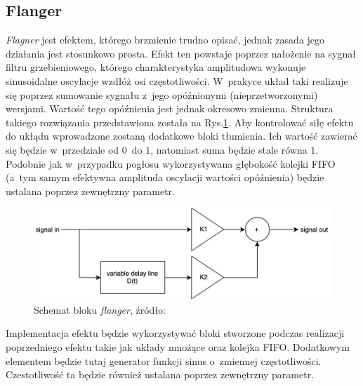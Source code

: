 
\subsection{Flanger}

\textit{Flagner} jest efektem, którego brzmienie trudno opisać, jednak zasada jego działania jest stosunkowo prosta. Efekt ten powstaje poprzez nałożenie na sygnał filtru grzebieniowego, którego charakterystyka amplitudowa wykonuje sinusoidalne oscylacje wzdłóż osi częstotliwości. W~prakyce układ taki realizuje się poprzez sumowanie sygnału z~jego opóźnionymi (nieprzetworzonymi) wersjami. Wartość tego opóźnienia jest jednak okresowo zmienna. Struktura takiego rozwiązania przedstawiona została na Rys.\ref{effects-flanger}. Aby kontrolować siłę efektu do ukłądu wprowadzone zostaną dodatkowe bloki tłumienia. Ich wartość zawierać się będzie w~przedziale od $0$~do $1$, natomiast suma będzie stale równa $1$. Podobnie jak w~przypadku pogłosu wykorzystywana głębokość kolejki FIFO (a~tym samym efektywna amplituda oscylacji wartości opóźnienia) będzie ustalana poprzez zewnętrzny parametr.

\vspace{0.5cm}
\begin{figure}[ht]
    \centering
    \includegraphics[scale=0.4]{img/theoretical-analysis/flanger.jpg}
    \captionsetup{format=plain,justification=centering}
    \caption{Schemat bloku \textit{flanger}, źródło: \cite{fpga_pedal}}
    \label{effects-flanger}
\end{figure}
\vspace{0.5cm}

Implementacja efektu będzie wykorzystywać bloki stworzone podczas realizacji poprzedniego efektu takie jak układy mnożące oraz kolejka FIFO. Dodatkowym elementem będzie tutaj generator funkcji sinus o~zmiennej częstotliwości. Czestotliwość ta będzie również ustalana poprzez zewnętrzny parametr.

